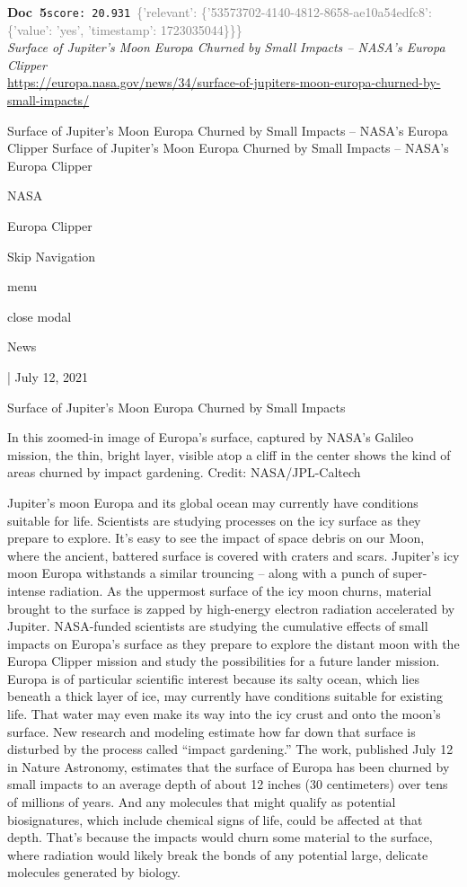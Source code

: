 \documentclass[a4paper,11pt]{article}
\begin{document}
\begin{docenv}
{\footnotesize\textcolor{doccolor}{\textbf{Doc~5}}}\hfill{\tiny\texttt{score:~20.931}}\ {\tiny\textcolor{gray}{\{'relevant': \{'53573702-4140-4812-8658-ae10a54edfc8': \{'value': 'yes', 'timestamp': 1723035044\}\}\}}}\\[3pt]
{\small\textit{Surface of Jupiter's Moon Europa Churned by Small Impacts – NASA's Europa Clipper}}\\[2pt]
{\tiny\url{https://europa.nasa.gov/news/34/surface-of-jupiters-moon-europa-churned-by-small-impacts/}}\\[4pt]
{\footnotesize Surface of Jupiter's Moon Europa Churned by Small Impacts – NASA's Europa Clipper
Surface of Jupiter's Moon Europa Churned by Small Impacts – NASA's Europa Clipper

NASA

Europa Clipper

Skip Navigation

menu

close modal

News

| July 12, 2021

Surface of Jupiter's Moon Europa Churned by Small Impacts

In this zoomed-in image of Europa’s surface, captured by NASA’s Galileo mission, the thin, bright layer, visible atop a cliff in the center shows the kind of areas churned by impact gardening. Credit: NASA/JPL-Caltech

Jupiter’s moon Europa and its global ocean may currently have conditions suitable for life. Scientists are studying processes on the icy surface as they prepare to explore.
It’s easy to see the impact of space debris on our Moon, where the ancient, battered surface is covered with craters and scars. Jupiter’s icy moon Europa withstands a similar trouncing – along with a punch of super-intense radiation. As the uppermost surface of the icy moon churns, material brought to the surface is zapped by high-energy electron radiation accelerated by Jupiter.
NASA-funded scientists are studying the cumulative effects of small impacts on Europa’s surface as they prepare to explore the distant moon with the Europa Clipper mission and study the possibilities for a future lander mission. Europa is of particular scientific interest because its salty ocean, which lies beneath a thick layer of ice, may currently have conditions suitable for existing life. That water may even make its way into the icy crust and onto the moon’s surface.
New research and modeling estimate how far down that surface is disturbed by the process called “impact gardening.” The work, published July 12 in Nature Astronomy, estimates that the surface of Europa has been churned by small impacts to an average depth of about 12 inches (30 centimeters) over tens of millions of years. And any molecules that might qualify as potential biosignatures, which include chemical signs of life, could be affected at that depth.
That’s because the impacts would churn some material to the surface, where radiation would likely break the bonds of any potential large, delicate molecules generated by biology.}
\end{docenv}
\end{document}
